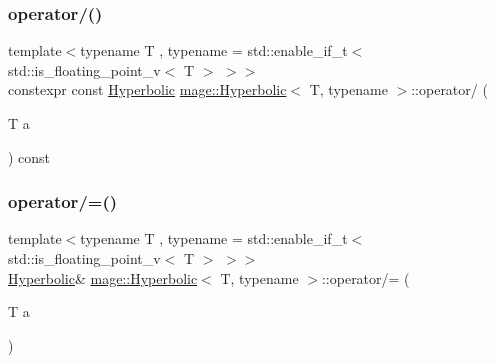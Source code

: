 \subsubsection{\texorpdfstring{operator/()}{operator/()}}
{\footnotesize\ttfamily template$<$typename T , typename  = std\+::enable\+\_\+if\+\_\+t$<$ std\+::is\+\_\+floating\+\_\+point\+\_\+v$<$ T $>$ $>$$>$ \\
constexpr const \mbox{\hyperlink{structmage_1_1_hyperbolic}{Hyperbolic}} \mbox{\hyperlink{structmage_1_1_hyperbolic}{mage\+::\+Hyperbolic}}$<$ T, typename $>$\+::operator/ (\begin{DoxyParamCaption}\item[{T}]{a }\end{DoxyParamCaption}) const\hspace{0.3cm}{\ttfamily [noexcept]}}

\mbox{\label{structmage_1_1_hyperbolic_ab89a46778d4ab42d0e5cd2a68c9b5278}} 
\subsubsection{\texorpdfstring{operator/=()}{operator/=()}}
{\footnotesize\ttfamily template$<$typename T , typename  = std\+::enable\+\_\+if\+\_\+t$<$ std\+::is\+\_\+floating\+\_\+point\+\_\+v$<$ T $>$ $>$$>$ \\
\mbox{\hyperlink{structmage_1_1_hyperbolic}{Hyperbolic}}\& \mbox{\hyperlink{structmage_1_1_hyperbolic}{mage\+::\+Hyperbolic}}$<$ T, typename $>$\+::operator/= (\begin{DoxyParamCaption}\item[{T}]{a }\end{DoxyParamCaption})\hspace{0.3cm}{\ttfamily [noexcept]}}

\mbox{\label{structmage_1_1_hyperbolic_a05e2a6cf6b2974a18b2d52f092c472fb}} 
